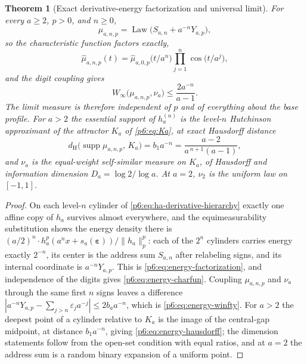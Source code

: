 \documentclass[11pt,oneside]{article}
\numberwithin{equation}{section}
\newtheorem{theorem}{Theorem}[section]
\theoremstyle{definition}
\theoremstyle{remark}
\newcommand{\Law}{\operatorname{Law}}
\begin{document}
\begin{theorem}[Exact derivative-energy factorization and universal limit]
\label{p6:thm:energy-factorization}
For every $a\ge2$, $p>0$, and $n\ge0$,
\begin{equation}\label{p6:eq:energy-factorization}
 \boxed{\ \mu_{a,n,p}=\Law\bigl(S_{a,n}+a^{-n}Y_{a,p}\bigr),\ }
\end{equation}
so the characteristic function factors exactly,
\begin{equation}\label{p6:eq:energy-charfun}
 \widehat\mu_{a,n,p}(t)
 =\widehat\mu_{a,0,p}\bigl(t/a^{n}\bigr)
 \prod_{j=1}^{n}\cos\bigl(t/a^{j}\bigr),
\end{equation}
and the digit coupling gives
\begin{equation}\label{p6:eq:energy-winfty}
 W_\infty\bigl(\mu_{a,n,p},\nu_a\bigr)\le\frac{2a^{-n}}{a-1}.
\end{equation}
The limit measure is therefore independent of $p$ and of everything about
the base profile.  For $a>2$ the essential support of $h_a^{(n)}$ is the
level-$n$ Hutchinson approximant of the attractor $K_a$ of
\eqref{p6:eq:Ka}, at exact Hausdorff distance
\begin{equation}\label{p6:eq:energy-hausdorff}
 d_{\mathrm H}\bigl(\operatorname{supp}\mu_{a,n,p},\,K_a\bigr)
 =b_1a^{-n}
 =\frac{a-2}{a^{\,n+1}(a-1)},
\end{equation}
and $\nu_a$ is the equal-weight self-similar measure on $K_a$, of Hausdorff
and information dimension $D_a=\log2/\log a$.  At $a=2$, $\nu_2$ is the
uniform law on $[-1,1]$.
\end{theorem}

\begin{proof}
On each level-$n$ cylinder of \eqref{p6:eq:ha-derivative-hierarchy} exactly
one affine copy of $h_a$ survives almost everywhere, and the
equimeasurability substitution shows the energy density there is
$(a/2)^n\cdot h_a^p(a^nx+s_a(\boldsymbol\varepsilon))/\|h_a\|_p^p$: each of
the $2^n$ cylinders carries energy exactly $2^{-n}$, its center is the
address sum $S_{a,n}$ after relabeling signs, and its internal coordinate is
$a^{-n}Y_{a,p}$.  This is \eqref{p6:eq:energy-factorization}, and
independence of the digits gives \eqref{p6:eq:energy-charfun}.  Coupling
$\mu_{a,n,p}$ and $\nu_a$ through the same first $n$ signs leaves a
difference $|a^{-n}Y_{a,p}-\sum_{j>n}\varepsilon_ja^{-j}|\le2b_aa^{-n}$,
which is \eqref{p6:eq:energy-winfty}.  For $a>2$ the deepest point of a
cylinder relative to $K_a$ is the image of the central-gap midpoint, at
distance $b_1a^{-n}$, giving \eqref{p6:eq:energy-hausdorff}; the dimension
statements follow from the open-set condition with equal ratios, and at
$a=2$ the address sum is a random binary expansion of a uniform point.
\end{proof}
\end{document}

